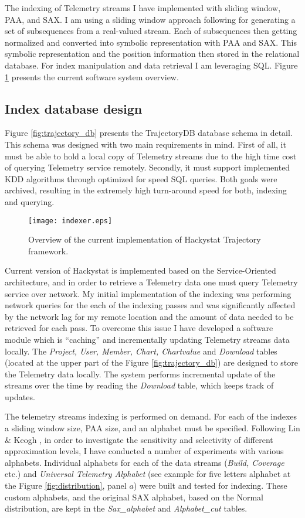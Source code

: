 The indexing of Telemetry streams I have implemented with sliding window, PAA, and SAX. I am using a sliding window approach following \cite{citeulike:2821475} for generating a set of subsequences from a real-valued stream. Each of subsequences then getting normalized and converted into symbolic representation with PAA and SAX. This symbolic representation and the position information then stored in the relational database. For index manipulation and data retrieval I am leveraging SQL. Figure \ref{fig:indexer} presents the current software system overview.

\subsection{Index database design}
Figure \ref{fig:trajectory_db} presents the TrajectoryDB database schema in detail. This schema was designed with two main requirements in mind. First of all, it must be able to hold a local copy of Telemetry streams due to the high time cost of querying Telemetry service remotely. Secondly, it must support implemented KDD algorithms through optimized for speed SQL queries. Both goals were archived, resulting in the extremely high turn-around speed for both, indexing and querying.

\begin{figure}[tbp]
   \centering
   \texttt{[image: indexer.eps]}
   \caption{Overview of the current implementation of Hackystat Trajectory framework.}
   \label{fig:indexer}
\end{figure}

Current version of Hackystat is implemented based on the Service-Oriented architecture, and in order to retrieve a Telemetry data one must query Telemetry service over network. My initial implementation of the indexing was performing network queries for the each of the indexing passes and was significantly affected by the network lag for my remote location and the amount of data needed to be retrieved for each pass. To overcome this issue I have developed a software module which is ``caching'' and incrementally updating Telemetry streams data locally. The \textit{Project, User, Member, Chart, Chartvalue} and \textit{Download} tables (located at the upper part of the Figure \ref{fig:trajectory_db}) are designed to store the Telemetry data locally. The system performs incremental update of the streams over the time by reading the \textit{Download} table, which keeps track of updates.

The telemetry streams indexing is performed on demand. For each of the indexes a sliding window size, PAA size, and an alphabet must be specified. Following Lin \& Keogh \cite{citeulike:2821475}, in order to investigate the sensitivity and selectivity of different approximation levels, I have conducted a number of experiments with various alphabets. Individual alphabets for each of the data streams (\textit{Build, Coverage} etc.) and \textit{Universal Telemetry Alphabet} (see example for five letters alphabet at the Figure \ref{fig:distribution}, panel $a$) were built and tested for indexing. These custom alphabets, and the original SAX alphabet, based on the Normal distribution, are kept in the \textit{Sax\_alphabet} and \textit{Alphabet\_cut} tables. 

